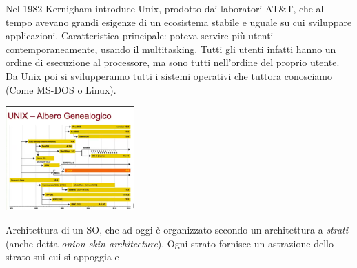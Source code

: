 \documentclass[
  paper=a4,
  oneside  ,captions=tableheading
]{scrbook}
\begin{document}
Nel 1982 Kernigham introduce Unix, prodotto dai laboratori AT\&T, che al
tempo avevano grandi esigenze di un ecosistema stabile e uguale su cui
sviluppare applicazioni. Caratteristica principale: poteva servire più
utenti contemporaneamente, usando il multitasking. Tutti gli utenti
infatti hanno un ordine di esecuzione al processore, ma sono tutti
nell'ordine del proprio utente. Da Unix poi si svilupperanno tutti i
sistemi operativi che tuttora conosciamo (Come MS-DOS o Linux).
\begin{center}
\includegraphics[height=4cm]{./image/image-20200930171019756.png}
\end{center}
Architettura di un SO, che ad oggi è organizzato secondo un architettura
a \emph{strati} (anche detta \emph{onion skin architecture}). Ogni
strato fornisce un astrazione dello strato sui cui si appoggia e
\end{document}
